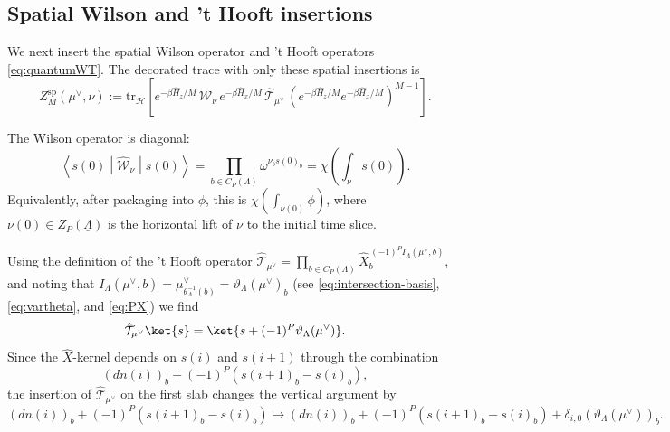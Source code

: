 \documentclass[dvipsnames,a4paper]{article}
\numberwithin{equation}{section}
\theoremstyle{definition}
\theoremstyle{remark}
\newcommand{\tr}{\mathrm{tr}}
\newcommand{\matrixel}[3]{\left\langle #1 \middle| #2 \middle| #3 \right\rangle}
\begin{document}
\subsection{Spatial Wilson and 't Hooft insertions}
\label{app:TrSp}

We next insert the spatial Wilson operator and 't Hooft operators \eqref{eq:quantumWT}.  The
decorated trace with only these spatial insertions is
\begin{equation}
	Z_M^{\mathrm{sp}}(\mu^\vee,\nu)
	:=
	\tr_{\mathcal H}
	\left[
	e^{-\beta\hat H_z/M}\,
	\hat{\mathcal W}_\nu\,
	e^{-\beta\hat H_x/M}\,
	\hat{\mathcal T}_{\mu^\vee}\,
	\left(e^{-\beta\hat H_z/M}e^{-\beta\hat H_x/M}\right)^{M-1}
	\right].
	\label{eq:spatially-decorated}
\end{equation}

The Wilson operator is diagonal:
\begin{equation}
	\matrixel{s(0)}{\hat{\mathcal W}_\nu}{s(0)}
	=
	\prod_{b\in C_P(\Lambda)}\omega^{\nu_b s(0)_b}
	=
	\chi\left(\int_\nu s(0)\right).
	\label{eq:spatial-W-factor}
\end{equation}
Equivalently, after packaging into \(\phi\), this is $\chi\left(\int_{\nu(0)}\phi\right)$,
where \(\nu(0)\in Z_P(\underline\Lambda)\) is the horizontal lift of \(\nu\) to the initial
time slice.

Using the definition of the 't Hooft operator $\hat{\mathcal T}_{\mu^\vee}
=
\prod_{b\in C_P(\Lambda)}
\hat X_b^{\,(-1)^PI_\Lambda(\mu^\vee,b)}$, and noting that $I_\Lambda(\mu^\vee, b) = \mu^\vee_{\theta_{\Lambda}^{-1}(b)} = \vartheta_{\Lambda}(\mu^\vee)_b$ (see \eqref{eq:intersection-basis}, \eqref{eq:vartheta}, and \eqref{eq:PX}) we find
\begin{equation}
	\hat{\mathcal T}_{\mu^\vee}\ket{s}
	=
	\ket{s+(-1)^P\vartheta_\Lambda(\mu^\vee)}.
	\label{eq:T-shift}
\end{equation}
Since the \(\hat X\)-kernel depends on \(s(i)\) and \(s(i+1)\) through the combination
\begin{equation}
	(dn(i))_b+(-1)^P\left(s(i+1)_b-s(i)_b\right),
\end{equation}
the insertion of \(\hat{\mathcal T}_{\mu^\vee}\) on the first slab changes the vertical
argument by
\begin{equation}
	(dn(i))_b+(-1)^P\left(s(i+1)_b-s(i)_b\right)
	\mapsto
	(dn(i))_b+(-1)^P\left(s(i+1)_b-s(i)_b\right)
	+\delta_{i,0}(\vartheta_\Lambda(\mu^\vee))_b.
	\label{eq:T-vertical-shift}
\end{equation}
\end{document}
